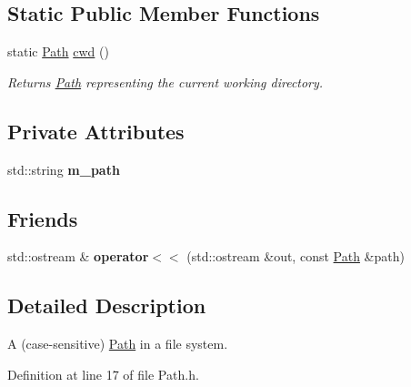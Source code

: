 \subsection*{Static Public Member Functions}
\begin{DoxyCompactItemize}
\item 
\mbox{\label{classnta_1_1utils_1_1Path_aec5671e324a330a1eb87ff1accc3514c}} 
static \hyperlink{classnta_1_1utils_1_1Path}{Path} \hyperlink{classnta_1_1utils_1_1Path_aec5671e324a330a1eb87ff1accc3514c}{cwd} ()
\begin{DoxyCompactList}\small\item\em Returns \hyperlink{classnta_1_1utils_1_1Path}{Path} representing the current working directory. \end{DoxyCompactList}\end{DoxyCompactItemize}
\subsection*{Private Attributes}
\begin{DoxyCompactItemize}
\item 
\mbox{\label{classnta_1_1utils_1_1Path_af858cf7caff9965fe406011e56818884}} 
std\+::string {\bfseries m\+\_\+path}
\end{DoxyCompactItemize}
\subsection*{Friends}
\begin{DoxyCompactItemize}
\item 
\mbox{\label{classnta_1_1utils_1_1Path_ac7fb093b2a174ecaf6de71271bbabe56}} 
std\+::ostream \& {\bfseries operator$<$$<$} (std\+::ostream \&out, const \hyperlink{classnta_1_1utils_1_1Path}{Path} \&path)
\end{DoxyCompactItemize}


\subsection{Detailed Description}
A (case-\/sensitive) \hyperlink{classnta_1_1utils_1_1Path}{Path} in a file system. 

Definition at line 17 of file Path.\+h.



